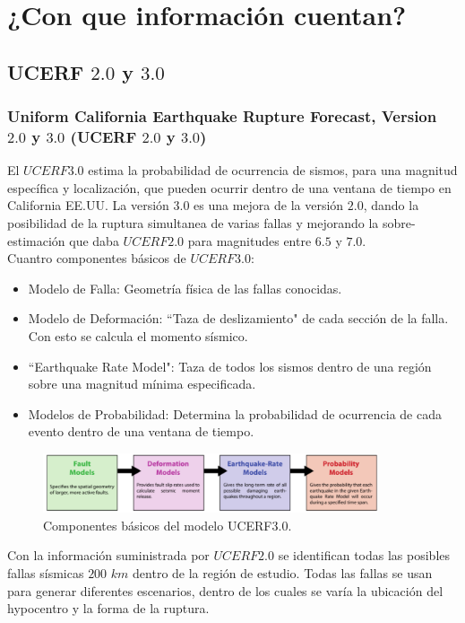 \documentclass{beamer}
\begin{document}
\section{¿Con que información cuentan?}
\subsection{UCERF $2.0$ y $3.0$}
\begin{frame}[allowframebreaks]
\frametitle{Uniform California Earthquake Rupture Forecast, Version $2.0$ y $3.0$ (UCERF $2.0$ y $3.0$)}
%
\justifying
%
El $UCERF3.0$ estima la probabilidad de ocurrencia de sismos, para una magnitud específica y localización, que pueden ocurrir dentro de una ventana de tiempo en California EE.UU. La versión $3.0$ es una mejora de la versión $2.0$, dando la posibilidad de la ruptura simultanea de varias fallas y mejorando la sobre-estimación que daba $UCERF2.0$ para magnitudes entre $6.5$ y $7.0$.\\
%
Cuantro componentes básicos de $UCERF3.0$:
%
	\begin{itemize}
	\justifying
		\item Modelo de Falla: Geometría física de las fallas conocidas.
		\item Modelo de Deformación: ``Taza de deslizamiento" de cada sección de la falla. Con esto se calcula el momento sísmico.
		\item ``Earthquake Rate Model": Taza de todos los sismos dentro de una región sobre una magnitud mínima especificada.
		\item Modelos de Probabilidad: Determina la probabilidad de ocurrencia de cada evento dentro de una ventana de tiempo.
	\end{itemize}
%
\begin{figure}[h]
	\centering
	\includegraphics[height=1.75cm]{img/Components_UCERF.pdf}
	\caption{Componentes básicos del modelo UCERF3.0. \cite[figura 2, página 7]{ucerf3}}
\end{figure}
%
%
\justifying
Con la información suministrada por $UCERF2.0$ se identifican todas las posibles fallas sísmicas $200$ $km$ dentro de la región de estudio. Todas las fallas se usan para generar diferentes escenarios, dentro de los cuales se varía la ubicación del hypocentro y la forma de la ruptura.\\

\end{frame}
\end{document}
